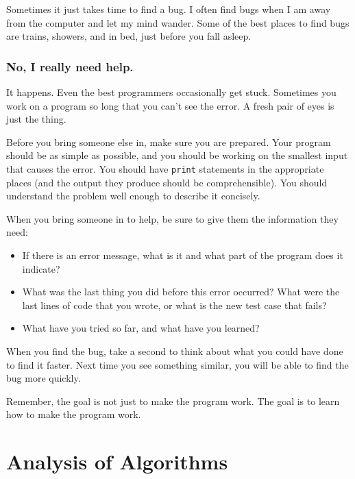 \documentclass[10pt]{book}
\begin{document}
Sometimes it just takes time to find a bug.  I often find bugs
when I am away from the computer and let my mind wander.  Some
of the best places to find bugs are trains, showers, and in bed,
just before you fall asleep.


\subsection{No, I really need help.}

It happens.  Even the best programmers occasionally get stuck.
Sometimes you work on a program so long that you can't see the
error.  A fresh pair of eyes is just the thing.

Before you bring someone else in, make sure you are prepared.
Your program should be as simple
as possible, and you should be working on the smallest input
that causes the error.  You should have {\tt print} statements in the
appropriate places (and the output they produce should be
comprehensible).  You should understand the problem well enough
to describe it concisely.

When you bring someone in to help, be sure to give
them the information they need:

\begin{itemize}

\item If there is an error message, what is it
and what part of the program does it indicate?

\item What was the last thing you did before this error occurred?
What were the last lines of code that you wrote, or what is
the new test case that fails?

\item What have you tried so far, and what have you learned?

\end{itemize}

When you find the bug, take a second to think about what you
could have done to find it faster.  Next time you see something
similar, you will be able to find the bug more quickly.

Remember, the goal is not just to make the program
work.  The goal is to learn how to make the program work.


\chapter{Analysis of Algorithms}
\end{document}
